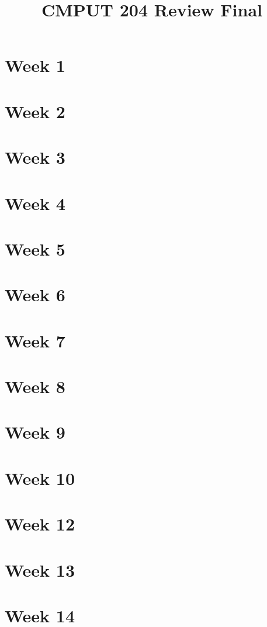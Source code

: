 \documentclass{exam}
\title{CMPUT 204 Review Final}
\begin{document}
\maketitle

\section{Week 1}

\section{Week 2}

\section{Week 3}

\section{Week 4}

\section{Week 5}

\section{Week 6}

\section{Week 7}

\section{Week 8}

\section{Week 9}

\section{Week 10}

\section{Week 12}

\section{Week 13}

\section{Week 14}
\end{document}
